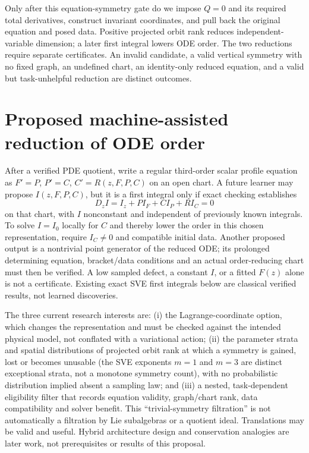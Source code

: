 \documentclass[11pt]{article}
\theoremstyle{definition}
\begin{document}
Only after this equation-symmetry gate do we impose $Q=0$ and its required
total derivatives, construct invariant coordinates, and pull back the
original equation and posed data. Positive projected orbit rank reduces
independent-variable dimension; a later first integral lowers ODE order.
The two reductions require separate certificates. An invalid candidate,
a valid vertical symmetry with no fixed graph, an undefined chart, an
identity-only reduced equation, and a valid but task-unhelpful reduction
are distinct outcomes.

\section{Proposed machine-assisted reduction of ODE order}
\label{sec:ml-order-proposal}
After a verified PDE quotient, write a regular third-order scalar profile
equation as $F'=P$, $P'=C$, $C'=R(z,F,P,C)$ on an open chart. A future learner
may propose $I(z,F,P,C)$, but it is a first integral only if exact checking
establishes
\begin{equation}\label{eq:proposed-first-integral-gate}
 D_zI=I_z+P I_F+C I_P+R I_C=0
\end{equation}
on that chart, with $I$ nonconstant and independent of previously known
integrals. To solve $I=I_0$ locally for $C$ and thereby lower the order in
this chosen representation, require $I_C\ne0$ and compatible initial data.
Another proposed output is a nontrivial point generator of the reduced ODE;
its prolonged determining equation, bracket/data conditions and an actual
order-reducing chart must then be verified. A low sampled defect, a constant
$I$, or a fitted $F(z)$ alone is not a certificate. Existing exact SVE first
integrals below are classical verified results, not learned discoveries.

The three current research interests are: (i) the Lagrange-coordinate option,
which changes the representation and must be checked against the intended
physical model, not conflated with a variational action; (ii) the parameter
strata and spatial distributions of projected orbit rank at which a symmetry
is gained, lost or becomes unusable (the SVE exponents $m=1$ and $m=3$
are distinct exceptional strata, not a monotone symmetry count), with no
probabilistic distribution implied absent a sampling law; and (iii) a nested,
task-dependent eligibility
filter that records equation validity, graph/chart rank, data compatibility
and solver benefit. This ``trivial-symmetry filtration'' is not automatically
a filtration by Lie subalgebras or a quotient ideal. Translations may be
valid and useful. Hybrid architecture design and conservation analogies are
later work, not prerequisites or results of this proposal.
\end{document}
